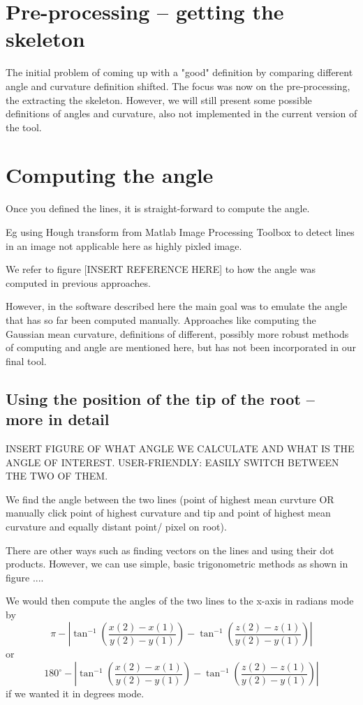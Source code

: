 \section{Pre-processing -- getting the skeleton}

The initial problem of coming up with a "good" definition by comparing different angle and curvature definition shifted. The focus was now on the pre-processing, the extracting the skeleton. 
However, we will still present some possible definitions of angles and curvature, also not implemented in the current version of the tool.

\section{Computing the angle}

Once you defined the lines, it is straight-forward to compute the angle.

Eg using Hough transform from Matlab Image Processing Toolbox to detect lines in an image not applicable here as highly pixled image.

We refer to figure [INSERT REFERENCE HERE] to how the angle was computed in previous approaches. 

However, in the software described here the main goal was to emulate the angle that has so far been computed manually. 
Approaches like computing the Gaussian mean curvature, definitions of different, possibly more robust methods of computing and angle are mentioned here, but has not been incorporated in our final tool. 

\subsection{Using the position of the tip of the root -- more in detail}

INSERT FIGURE OF WHAT ANGLE WE CALCULATE AND WHAT IS THE ANGLE OF INTEREST. 
USER-FRIENDLY: EASILY SWITCH BETWEEN THE TWO OF THEM.

We find the angle between the two lines (point of highest mean curvture OR manually click point of highest curvature and tip and point of highest mean curvature and equally distant point/ pixel on root).

There are other ways such as finding vectors on the lines and using their dot products. However, we can use simple, basic trigonometric methods as shown in figure ....

We would then compute the angles of the two lines to the x-axis  in radians mode by 
\[
\pi - | \tan^{-1}(\frac{x(2) - x(1)}{y(2) - y(1)}) - \tan^{-1}(\frac{z(2) - z(1)}{y(2) - y(1)}) |
\]
or 
\[
180^{\circ} - | \tan^{-1}(\frac{x(2) - x(1)}{y(2) - y(1)}) - \tan^{-1}(\frac{z(2) - z(1)}{y(2) - y(1)}) |
\]
if we wanted it in degrees mode.

